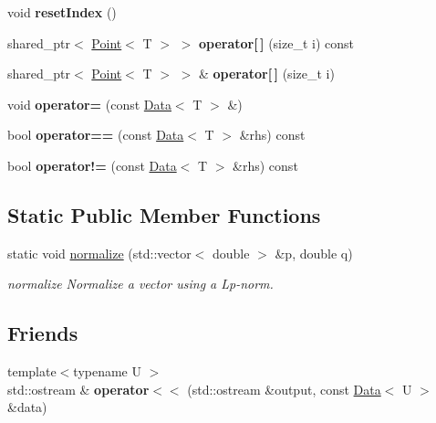 \begin{DoxyCompactItemize}
\mbox{\label{class_data_aae060f1a0ce3448b8e9b9f63d9ee4bbc}} 
void {\bfseries reset\+Index} ()
\item 
\mbox{\label{class_data_a648cf5e0c60535f619afba52da6ad67a}} 
shared\+\_\+ptr$<$ \hyperlink{class_point}{Point}$<$ T $>$ $>$ {\bfseries operator\mbox{[}$\,$\mbox{]}} (size\+\_\+t i) const
\item 
\mbox{\label{class_data_a5fc899679b391fabdef42db15136a375}} 
shared\+\_\+ptr$<$ \hyperlink{class_point}{Point}$<$ T $>$ $>$ \& {\bfseries operator\mbox{[}$\,$\mbox{]}} (size\+\_\+t i)
\item 
\mbox{\label{class_data_a108d2986a26cfe07f7a4ee5a2e8e1c9b}} 
void {\bfseries operator=} (const \hyperlink{class_data}{Data}$<$ T $>$ \&)
\item 
\mbox{\label{class_data_a67b4eb14ee534c26b115e35ac9537baa}} 
bool {\bfseries operator==} (const \hyperlink{class_data}{Data}$<$ T $>$ \&rhs) const
\item 
\mbox{\label{class_data_a36bc3fedaadbe06283b6796018381e2c}} 
bool {\bfseries operator!=} (const \hyperlink{class_data}{Data}$<$ T $>$ \&rhs) const
\end{DoxyCompactItemize}
\subsection*{Static Public Member Functions}
\begin{DoxyCompactItemize}
\item 
static void \hyperlink{class_data_a11440c71d8f4dc4f4c064c06c0ae1b4e}{normalize} (std\+::vector$<$ double $>$ \&p, double q)
\begin{DoxyCompactList}\small\item\em normalize Normalize a vector using a Lp-\/norm. \end{DoxyCompactList}\end{DoxyCompactItemize}
\subsection*{Friends}
\begin{DoxyCompactItemize}
\item 
\mbox{\label{class_data_a6e0fbda87f04e3f9960f8f2a818e2f9d}} 
{\footnotesize template$<$typename U $>$ }\\std\+::ostream \& {\bfseries operator$<$$<$} (std\+::ostream \&output, const \hyperlink{class_data}{Data}$<$ U $>$ \&data)
\end{DoxyCompactItemize}


